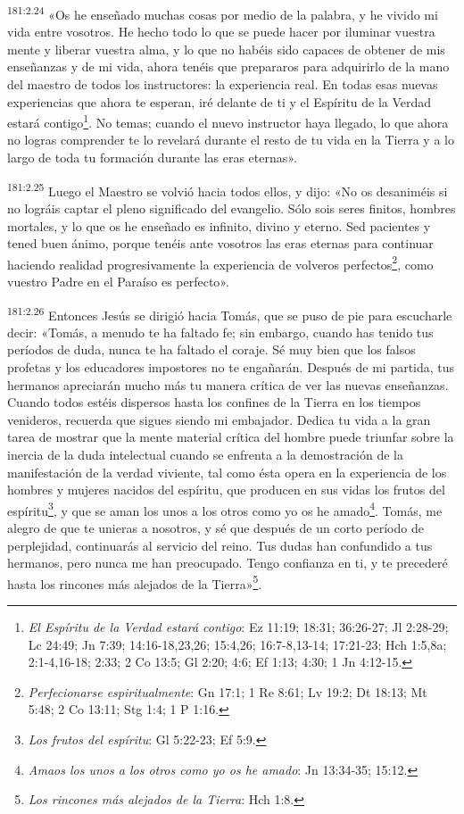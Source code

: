 \par 
\textsuperscript{181:2.24} «Os he enseñado muchas cosas por medio de la palabra, y he vivido mi vida entre vosotros. He hecho todo lo que se puede hacer por iluminar vuestra mente y liberar vuestra alma, y lo que no habéis sido capaces de obtener de mis enseñanzas y de mi vida, ahora tenéis que prepararos para adquirirlo de la mano del maestro de todos los instructores: la experiencia real. En todas esas nuevas experiencias que ahora te esperan, iré delante de ti y el Espíritu de la Verdad estará contigo\footnote{\textit{El Espíritu de la Verdad estará contigo}: Ez 11:19; 18:31; 36:26-27; Jl 2:28-29; Lc 24:49; Jn 7:39; 14:16-18,23,26; 15:4,26; 16:7-8,13-14; 17:21-23; Hch 1:5,8a; 2:1-4,16-18; 2:33; 2 Co 13:5; Gl 2:20; 4:6; Ef 1:13; 4:30; 1 Jn 4:12-15.}. No temas; cuando el nuevo instructor haya llegado, lo que ahora no logras comprender te lo revelará durante el resto de tu vida en la Tierra y a lo largo de toda tu formación durante las eras eternas».

\par 
\textsuperscript{181:2.25} Luego el Maestro se volvió hacia todos ellos, y dijo: «No os desaniméis si no lográis captar el pleno significado del evangelio. Sólo sois seres finitos, hombres mortales, y lo que os he enseñado es infinito, divino y eterno. Sed pacientes y tened buen ánimo, porque tenéis ante vosotros las eras eternas para continuar haciendo realidad progresivamente la experiencia de volveros perfectos\footnote{\textit{Perfecionarse espiritualmente}: Gn 17:1; 1 Re 8:61; Lv 19:2; Dt 18:13; Mt 5:48; 2 Co 13:11; Stg 1:4; 1 P 1:16.}, como vuestro Padre en el Paraíso es perfecto».

\par 
\textsuperscript{181:2.26} Entonces Jesús se dirigió hacia Tomás, que se puso de pie para escucharle decir: «Tomás, a menudo te ha faltado fe; sin embargo, cuando has tenido tus períodos de duda, nunca te ha faltado el coraje. Sé muy bien que los falsos profetas y los educadores impostores no te engañarán. Después de mi partida, tus hermanos apreciarán mucho más tu manera crítica de ver las nuevas enseñanzas. Cuando todos estéis dispersos hasta los confines de la Tierra en los tiempos venideros, recuerda que sigues siendo mi embajador. Dedica tu vida a la gran tarea de mostrar que la mente material crítica del hombre puede triunfar sobre la inercia de la duda intelectual cuando se enfrenta a la demostración de la manifestación de la verdad viviente, tal como ésta opera en la experiencia de los hombres y mujeres nacidos del espíritu, que producen en sus vidas los frutos del espíritu\footnote{\textit{Los frutos del espíritu}: Gl 5:22-23; Ef 5:9.}, y que se aman los unos a los otros como yo os he amado\footnote{\textit{Amaos los unos a los otros como yo os he amado}: Jn 13:34-35; 15:12.}. Tomás, me alegro de que te unieras a nosotros, y sé que después de un corto período de perplejidad, continuarás al servicio del reino. Tus dudas han confundido a tus hermanos, pero nunca me han preocupado. Tengo confianza en ti, y te precederé hasta los rincones más alejados de la Tierra»\footnote{\textit{Los rincones más alejados de la Tierra}: Hch 1:8.}.

